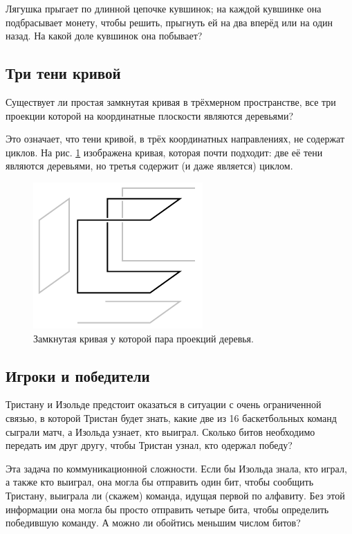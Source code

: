 Лягушка прыгает по длинной цепочке кувшинок;
на каждой кувшинке она подбрасывает монету, чтобы решить, прыгнуть ей на два вперёд или на один назад.
На какой доле кувшинок она побывает?

\subsection*{Три тени кривой}\label{Три тени кривой}

Существует ли простая замкнутая кривая в трёхмерном пространстве, все три проекции которой на координатные плоскости являются деревьями?

Это означает, что тени кривой, в трёх координатных направлениях, не содержат циклов.
На рис. \ref{pic:proj1} изображена кривая, которая почти подходит: две её тени являются деревьями, но третья содержит (и даже является) циклом.

\begin{figure}[htb!]
\centering
\includegraphics[scale=1]{pics/proj1}
\caption{Замкнутая кривая у которой пара проекций деревья.}
\label{pic:proj1}
\end{figure}

\subsection*{Игроки и победители}

Тристану и Изольде предстоит оказаться в ситуации с очень ограниченной связью, в которой Тристан будет знать, какие две из 16 баскетбольных команд сыграли матч, а Изольда узнает, кто выиграл.
Сколько битов необходимо передать им друг другу, чтобы Тристан узнал, кто одержал победу?

Эта задача по коммуникационной сложности.
Если бы Изольда знала, кто играл, а также кто выиграл, она могла бы отправить один бит, чтобы сообщить Тристану, выиграла ли (скажем) команда, идущая первой по алфавиту.
Без этой информации она могла бы просто отправить четыре бита, чтобы определить победившую команду.
А можно ли обойтись меньшим числом битов?

